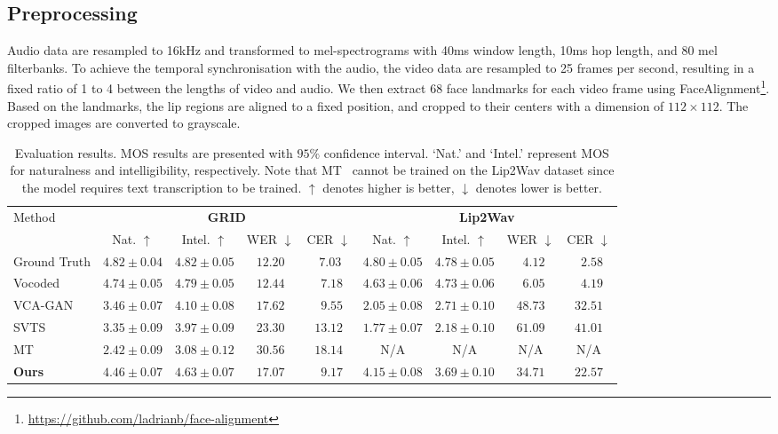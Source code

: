 \documentclass[letterpaper]{article} %
\begin{document}
\subsection{Preprocessing}
Audio data are resampled to 16kHz and transformed to mel-spectrograms with 40ms window length, 10ms hop length, and 80 mel filterbanks.
To achieve the temporal synchronisation with the audio, the video data are resampled to 25 frames per second, resulting in a fixed ratio of 1 to 4 between the lengths of video and audio.
We then extract 68 face landmarks for each video frame using FaceAlignment\footnote{\url{https://github.com/ladrianb/face-alignment}}.
Based on the landmarks, the lip regions are aligned to a fixed position, and cropped to their centers with a dimension of $112 \times 112$.
The cropped images are converted to grayscale.

\begin{table}[t]
\centering
{
\begin{tabular}{lcccccccc}
\toprule
\multirow{2}{*}{Method}     & \multicolumn{4}{c}{\bfseries GRID} & \multicolumn{4}{c}{\bfseries Lip2Wav} \\ \cmidrule(lr){2-5}\cmidrule(lr){6-9}
& Nat. $\uparrow$   & Intel. $\uparrow$   &WER $\downarrow$ &CER $\downarrow$ & Nat. $\uparrow$  &Intel. $\uparrow$  &WER $\downarrow$  &CER $\downarrow$   \\ \cmidrule(lr){1-9}
Ground Truth    &$4.82\pm0.04$ &$4.82\pm0.05$  &$12.20$ &$~7.03$ &$4.80\pm0.05$   & $4.78\pm0.05$   &~$4.12$ &~$2.58$      \\
Vocoded &$4.74\pm0.05$       &$4.79\pm0.05$    &$12.44$ &~$7.18$ &$4.63\pm0.06$     &$4.73\pm0.06$ &~$6.05$ &~$4.19$    \\\cmidrule(lr){1-9}
VCA-GAN &$3.46\pm0.07$ &$4.10\pm0.08$ &$17.62$ &~$9.55$ &$2.05\pm0.08$ &$2.71\pm0.10$ &$48.73$ &$32.51$   \\
SVTS &$3.35\pm0.09$       &$3.97\pm0.09$ &$23.30$ &$13.12$ &$1.77\pm0.07$ & $2.18\pm0.10$   &$61.09$ &$41.01$ \\
MT &$2.42\pm0.09$  & $3.08\pm0.12$  &$30.56$ &$18.14$ &N/A &N/A   &N/A &N/A \\
\textbf{Ours}  &$\mathbf{4.46}\pm\mathbf{0.07}$ &$\mathbf{4.63}\pm\mathbf{0.07}$ &$\mathbf{17.07}$ &~$\mathbf{9.17}$ & $\mathbf{4.15}\pm\mathbf{0.08}$ &$\mathbf{3.69}\pm\mathbf{0.10}$  &$\mathbf{34.71}$ &$\mathbf{22.57}$ \\
\bottomrule
\end{tabular}
}
\caption{Evaluation results. MOS results are presented with $95\%$ confidence interval. `Nat.' and `Intel.' represent MOS for naturalness and intelligibility, respectively. Note that MT~\cite{kim2023lip} cannot be trained on the Lip2Wav dataset since the model requires text transcription to be trained. $\uparrow$ denotes higher is better, $\downarrow$ denotes lower is better.}
\label{table:compare}
\end{table}
\end{document}
